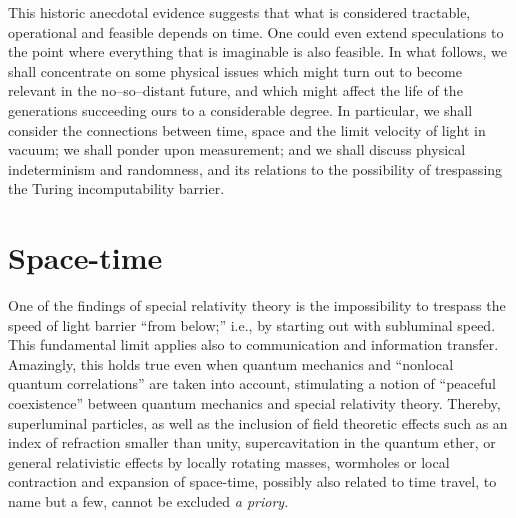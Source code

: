 \documentclass[11pt, pra,amsfonts,showpacs,showkeys]{revtex4}%
\begin{document}
This historic anecdotal evidence suggests that what is considered tractable,
operational and feasible depends on time.
One could even extend speculations to the point where everything that is imaginable is also feasible.
In what follows, we shall concentrate on some physical issues which might turn out to become relevant in the
no--so--distant future, and which might affect the life of
the generations succeeding ours to a considerable degree.
In particular, we shall consider the connections between time, space and the limit velocity of light in vacuum;
we shall ponder upon measurement;
and we shall discuss physical indeterminism and randomness, and  its relations to the possibility of trespassing the Turing incomputability barrier.

\section{Space-time}

One of the findings of special relativity theory is the impossibility to trespass the speed of light barrier ``from below;''
i.e., by starting out with subluminal speed.
This fundamental limit applies also to communication and information transfer.
Amazingly, this holds true even when quantum mechanics and ``nonlocal quantum correlations'' are taken into account,
stimulating a notion of ``peaceful coexistence'' between quantum mechanics and special relativity theory.
Thereby, superluminal particles,
as well as the inclusion of field theoretic effects such as an index of refraction smaller than unity,
supercavitation in the quantum ether,
or general relativistic effects by locally rotating masses,
wormholes or local contraction and expansion of space-time,
possibly also related to time travel,
to name but a few, cannot be  excluded {\it a priory.}


\end{document}
